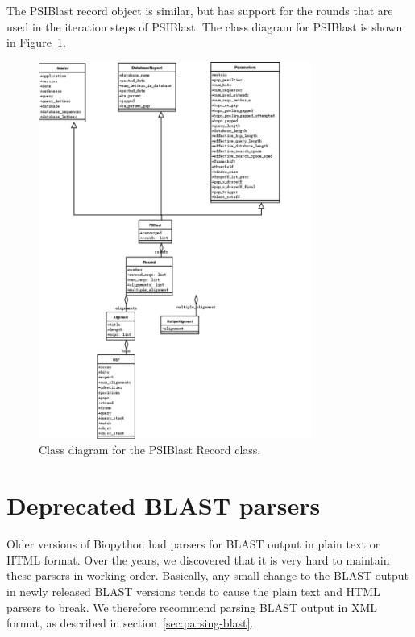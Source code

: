 \documentclass{report}
\begin{document}
The PSIBlast record object is similar, but has support for the rounds that are used in the iteration steps of PSIBlast. The class diagram for PSIBlast is shown in Figure~\ref{fig:psiblastrecord}.

\begin{htmlonly}
\label{fig:psiblastrecord}
\end{htmlonly}

\begin{latexonly}
\begin{figure}[htbp]
\centering
\includegraphics[width=0.8\textwidth]{images/PSIBlastRecord.png}
\caption{Class diagram for the PSIBlast Record class.}
\label{fig:psiblastrecord}
\end{figure}
\end{latexonly}

\section{Deprecated BLAST parsers}
\label{sec:parsing-blast-deprecated}

Older versions of Biopython had parsers for BLAST output in plain text or HTML
format. Over the years, we discovered that it is very hard to maintain these
parsers in working order. Basically, any small change to the BLAST output in
newly released BLAST versions tends to cause the plain text and HTML parsers
to break. We therefore recommend parsing BLAST output in XML format, as
described in section~\ref{sec:parsing-blast}.
\end{document}
